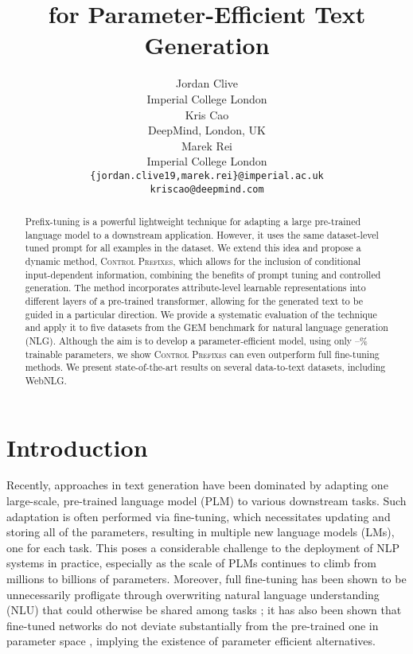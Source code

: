 \documentclass[11pt]{article}
\title{\control for Parameter-Efficient Text Generation}
\author{Jordan Clive\\
  Imperial College London \\
   \And
  Kris Cao \\
  DeepMind, London, UK \\
  \And
  Marek Rei \\
  Imperial College London
 \AND \\
 \texttt{\{jordan.clive19,marek.rei\}@imperial.ac.uk} \\
 \texttt{kriscao@deepmind.com} 
 }
\newcommand{\control}{\textsc{Control Prefixes}\xspace}
\begin{document}
\maketitle
\begin{abstract}


Prefix-tuning is a powerful lightweight technique for adapting a large pre-trained language model to a downstream application. However, it uses the same dataset-level tuned prompt for all examples in the dataset. We extend this idea and propose a dynamic method, \control, which allows for the inclusion of conditional input-dependent information, combining the benefits of prompt tuning and controlled generation. The method incorporates attribute-level learnable representations into different layers of a pre-trained transformer, allowing for the generated text to be guided in a particular direction. We provide a systematic evaluation of the technique and apply it to five datasets from the GEM benchmark for natural language generation (NLG). Although the aim is to develop a parameter-efficient model,  using only –\% trainable parameters, we show \control can even outperform full fine-tuning methods. We present state-of-the-art results on several data-to-text datasets, including WebNLG.

\end{abstract}


\section{Introduction}
Recently, approaches in text generation have been dominated by adapting one large-scale, pre-trained language model (PLM) to various downstream tasks. Such adaptation is often performed via fine-tuning, which necessitates updating and storing all of the parameters, resulting in multiple new language models (LMs), one for each task. This poses a considerable challenge to the deployment of NLP systems in practice, especially as the scale of PLMs continues to climb from millions to billions of parameters. Moreover, full fine-tuning has been shown to be unnecessarily profligate through overwriting natural language understanding (NLU) that could otherwise be shared among tasks \citep{poor_finetune}; it has also been shown that fine-tuned networks do not deviate substantially from the pre-trained one in parameter space \citep{aghajanyan20,dixit2020How}, implying the existence of parameter efficient alternatives.
\end{document}

